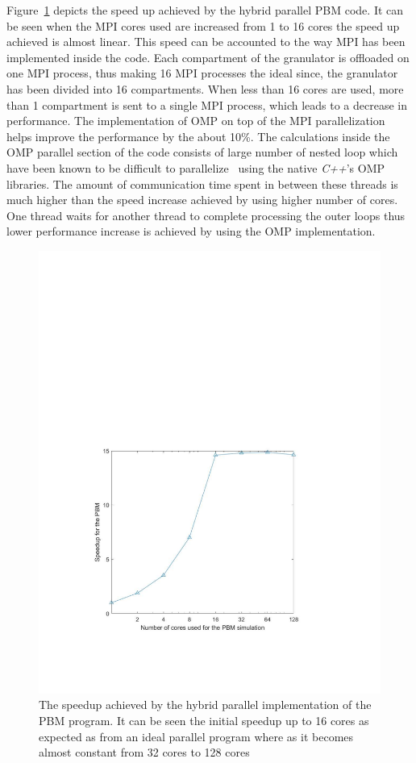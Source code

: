 \documentclass[preprint,11pt,authoryear]{elsarticle}
\begin{document}
Figure~\ref{fig:rslts_PBM_speed_up} depicts the speed up achieved by the hybrid parallel PBM code. It 
can be seen when the MPI cores used are increased from 1 to 16 cores the speed up achieved is 
almost linear. This speed can be accounted to the way MPI has been implemented inside the code. 
Each compartment of the granulator is  offloaded on one MPI process, thus making 16 MPI processes 
the ideal since, the granulator has been divided into 16 compartments. When less than 16 cores are used, 
more than 1 compartment is sent to a single MPI process, which leads to a 
decrease in performance. The implementation of OMP on top of the MPI parallelization helps improve 
the performance by the about 10\%. The calculations inside the OMP parallel section of the code 
consists of large number of nested loop which have been known to be difficult to parallelize~\citep{He2016} using the native \textit{C++}'s OMP libraries. The amount of communication time spent in 
between these threads is much higher than the speed increase achieved by using higher number of 
cores. One thread waits for another thread to complete processing the outer loops thus lower 
performance increase is achieved by using the OMP implementation. \\

\begin{figure}
\centering
\includegraphics[scale=0.75]{rslsts_PBM_speedup_logx.pdf}
\caption{The speedup achieved by the hybrid parallel implementation of the PBM program. It can be 
seen the initial speedup up to 16 cores as expected as from an ideal parallel 
program where as it 
becomes almost constant from 32 cores to 128 cores}
\label{fig:rslts_PBM_speed_up}
\end{figure}
\end{document}
